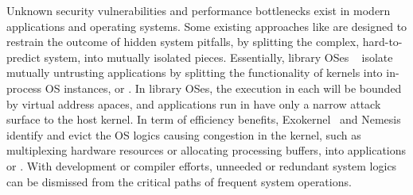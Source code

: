 Unknown security vulnerabilities and performance bottlenecks exist
in modern applications and operating systems.
Some existing approaches like \liboses{}
are designed to restrain
the outcome of hidden system pitfalls, %
by splitting the complex, hard-to-predict system,
into mutually isolated pieces.
Essentially, library OSes
~\citep{porter11drawbridge, baumann13bascule, unikernels}
isolate mutually untrusting applications
by splitting the functionality of kernels into in-process OS instances,
or \term{\picoprocs{}}.
In library OSes, the execution in each \picoprocs{}
will be bounded by virtual address apaces,
and applications run in \picoprocs{} have only a narrow attack surface to the host kernel.
In term of efficiency benefits,
Exokernel~\citep{engler95exokernel}
and Nemesis~\citep{leslie96nemesis}
identify and evict the OS logics causing congestion in the kernel,
such as multiplexing hardware resources or allocating processing buffers,
into applications or \liboses{}.
With development or compiler efforts,
unneeded or redundant system logics
can be dismissed
from the critical paths of frequent system operations.






